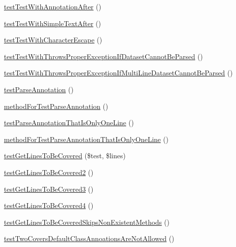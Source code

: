\begin{DoxyCompactItemize}
\mbox{\hyperlink{class_util___test_test_af397d2d768e6a0b49a9c822717623264}{test\+Test\+With\+Annotation\+After}} ()
\item 
\mbox{\hyperlink{class_util___test_test_a44cd62f566cbacbf41253a3cfc3459d1}{test\+Test\+With\+Simple\+Text\+After}} ()
\item 
\mbox{\hyperlink{class_util___test_test_a678c85f623ba8a1eba87cae1f9cd2dd4}{test\+Test\+With\+Character\+Escape}} ()
\item 
\mbox{\hyperlink{class_util___test_test_a317c92f6941cecc125e4d23c218b9524}{test\+Test\+With\+Throws\+Proper\+Exception\+If\+Dataset\+Cannot\+Be\+Parsed}} ()
\item 
\mbox{\hyperlink{class_util___test_test_a8e0eeae555ec203058ee32bcd44839dd}{test\+Test\+With\+Throws\+Proper\+Exception\+If\+Multi\+Line\+Dataset\+Cannot\+Be\+Parsed}} ()
\item 
\mbox{\hyperlink{class_util___test_test_ae4d1633c1531d814194d8718e790e4d0}{test\+Parse\+Annotation}} ()
\item 
\mbox{\hyperlink{class_util___test_test_a1112af8e17acda40014140dcbef0b0ef}{method\+For\+Test\+Parse\+Annotation}} ()
\item 
\mbox{\hyperlink{class_util___test_test_a8dd8ebba0f0dd43ec0d6365ccf58383f}{test\+Parse\+Annotation\+That\+Is\+Only\+One\+Line}} ()
\item 
\mbox{\hyperlink{class_util___test_test_a7771fb65b6afc32bd239dd5542c4ec98}{method\+For\+Test\+Parse\+Annotation\+That\+Is\+Only\+One\+Line}} ()
\item 
\mbox{\hyperlink{class_util___test_test_a4ad98bffd7f7b9ed254ba179fae900a0}{test\+Get\+Lines\+To\+Be\+Covered}} (\$test, \$lines)
\item 
\mbox{\hyperlink{class_util___test_test_ad9a9a8d6ea2071eca4ded40a331d88c6}{test\+Get\+Lines\+To\+Be\+Covered2}} ()
\item 
\mbox{\hyperlink{class_util___test_test_a93876c16c0bcff06b2a64547df22f9a5}{test\+Get\+Lines\+To\+Be\+Covered3}} ()
\item 
\mbox{\hyperlink{class_util___test_test_a71cddb671efbce2319bc87bc29138823}{test\+Get\+Lines\+To\+Be\+Covered4}} ()
\item 
\mbox{\hyperlink{class_util___test_test_acb3e12d61661a0943e2fd3c7081709aa}{test\+Get\+Lines\+To\+Be\+Covered\+Skips\+Non\+Existent\+Methods}} ()
\item 
\mbox{\hyperlink{class_util___test_test_a3dbbee3d4a70c20779525bbf522b0f7f}{test\+Two\+Covers\+Default\+Class\+Annoations\+Are\+Not\+Allowed}} ()
\item 

\end{DoxyCompactItemize}
